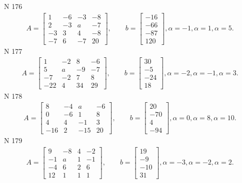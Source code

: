 \documentclass[11pt]{report}
\begin{document}
N 176
\begin{align*}
 A = \left[\begin{matrix}1 & -6 & -3 & -8\\2 & -3 & a & -7\\-3 & 3 & 4 & -8\\-7 & 6 & -7 & 20\end{matrix}\right],
    \qquad b = \left[\begin{matrix}-16\\-66\\-87\\120\end{matrix}\right], \alpha = -1, \alpha = 1, \alpha = 5. 
 \end{align*}
N 177
\begin{align*}
 A = \left[\begin{matrix}1 & -2 & 8 & -6\\5 & a & -9 & -7\\-7 & -2 & 7 & 8\\-22 & 4 & 34 & 29\end{matrix}\right],
    \qquad b = \left[\begin{matrix}30\\-5\\-24\\18\end{matrix}\right], \alpha = -2, \alpha = -1, \alpha = 3. 
 \end{align*}
N 178
\begin{align*}
 A = \left[\begin{matrix}8 & -4 & a & -6\\0 & -6 & 1 & 8\\4 & 4 & -1 & 3\\-16 & 2 & -15 & 20\end{matrix}\right],
    \qquad b = \left[\begin{matrix}20\\-70\\4\\-94\end{matrix}\right], \alpha = 0, \alpha = 8, \alpha = 10. 
 \end{align*}
N 179
\begin{align*}
 A = \left[\begin{matrix}9 & -8 & 4 & -2\\-1 & a & 1 & -1\\-4 & 6 & 2 & 6\\12 & 1 & 1 & 1\end{matrix}\right],
    \qquad b = \left[\begin{matrix}19\\-9\\-10\\31\end{matrix}\right], \alpha = -3, \alpha = -2, \alpha = 2. 
 \end{align*}
\end{document}
